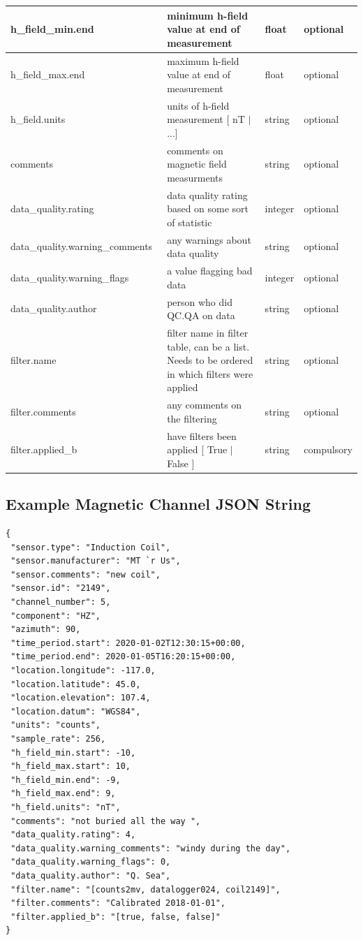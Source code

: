 \documentclass{article}
\begin{document}
\begin{table}[htb!]
\begin{tabular}{|l|p{3in}|l|l|}
        h\_field\_min.end\ & minimum h-field value at end of measurement & float &  optional\\ \hline
        h\_field\_max.end\ & maximum h-field value at end of measurement & float &  optional\\ \hline
        h\_field.units\ & units of h-field measurement [ nT $|$ ...] & string &   optional \\ \hline
        comments\ & comments on magnetic field measurments & string &  optional \\ \hline
        data\_quality.rating\ & data quality rating based on some sort of statistic & integer &  optional \\ \hline
        data\_quality.warning\_comments\ & any warnings about data quality & string &   optional \\ \hline
        data\_quality.warning\_flags\ & a value flagging bad data  & integer &  optional \\ \hline
        data\_quality.author\ & person who did QC.QA on data & string &   optional \\ \hline
        filter.name\ & filter name in filter table, can be a list. Needs to be ordered in which filters were applied & string &  optional \\ \hline
        filter.comments\ & any comments on the filtering & string &  optional \\ \hline
        filter.applied\_b & have filters been applied [ True $|$ False ] & string & compulsory \\ \hline
        \end{tabular}
    \label{tab:magnetic}
\end{table}

\newpage
\subsection{Example Magnetic Channel JSON String}

\begin{verbatim}
{
 "sensor.type": "Induction Coil",
 "sensor.manufacturer": "MT `r Us",
 "sensor.comments": "new coil",
 "sensor.id": "2149",
 "channel_number": 5,
 "component": "HZ",
 "azimuth": 90,
 "time_period.start": 2020-01-02T12:30:15+00:00,
 "time_period.end": 2020-01-05T16:20:15+00:00,
 "location.longitude": -117.0,
 "location.latitude": 45.0,
 "location.elevation": 107.4,
 "location.datum": "WGS84",
 "units": "counts",
 "sample_rate": 256,
 "h_field_min.start": -10,
 "h_field_max.start": 10,
 "h_field_min.end": -9,
 "h_field_max.end": 9,
 "h_field.units": "nT",
 "comments": "not buried all the way ",
 "data_quality.rating": 4,
 "data_quality.warning_comments": "windy during the day",
 "data_quality.warning_flags": 0,
 "data_quality.author": "Q. Sea",
 "filter.name": "[counts2mv, datalogger024, coil2149]",
 "filter.comments": "Calibrated 2018-01-01",
 "filter.applied_b": "[true, false, false]"
}
\end{verbatim}
\end{document}
